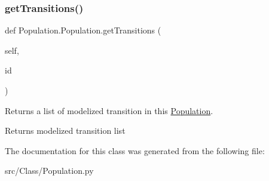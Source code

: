 \subsubsection{\texorpdfstring{getTransitions()}{getTransitions()}}
{\footnotesize\ttfamily def Population.\+Population.\+get\+Transitions (\begin{DoxyParamCaption}\item[{}]{self,  }\item[{}]{id }\end{DoxyParamCaption})}



Returns a list of modelized transition in this \mbox{\hyperlink{classPopulation_1_1Population}{Population}}. 

\begin{DoxyReturn}{Returns}
modelized transition list 
\end{DoxyReturn}


The documentation for this class was generated from the following file\+:\begin{DoxyCompactItemize}
\item 
src/\+Class/Population.\+py\end{DoxyCompactItemize}
